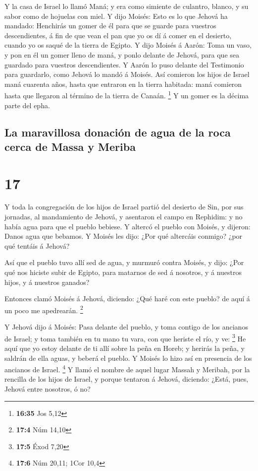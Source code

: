 Y la casa de Israel lo llamó Maná; y era como simiente
de culantro, blanco, y su sabor como de hojuelas con miel.
 Y dijo Moisés: Esto es lo que Jehová ha mandado:
Henchirás un gomer de él para que se guarde para vuestros descendientes,
á fin de que vean el pan que yo os dí á comer en el desierto, cuando yo
os saqué de la tierra de Egipto.  Y dijo Moisés á Aarón:
Toma un vaso, y pon en él un gomer lleno de maná, y ponlo delante de
Jehová, para que sea guardado para vuestros descendientes.
 Y Aarón lo puso delante del Testimonio para guardarlo,
como Jehová lo mandó á Moisés.  Así comieron los hijos de
Israel maná cuarenta años, hasta que entraron en la tierra habitada:
maná comieron hasta que llegaron al término de la tierra de Canaán.
\footnote{\textbf{16:35} Jos 5,12}  Y un gomer es la
décima parte del epha.

\hypertarget{la-maravillosa-donaciuxf3n-de-agua-de-la-roca-cerca-de-massa-y-meriba}{%
\subsection{La maravillosa donación de agua de la roca cerca de Massa y
Meriba}\label{la-maravillosa-donaciuxf3n-de-agua-de-la-roca-cerca-de-massa-y-meriba}}

\hypertarget{section-16}{%
\section{17}\label{section-16}}

 Y toda la congregación de los hijos de Israel partió del
desierto de Sin, por sus jornadas, al mandamiento de Jehová, y asentaron
el campo en Rephidim: y no había agua para que el pueblo bebiese.
 Y altercó el pueblo con Moisés, y dijeron: Danos agua que
bebamos. Y Moisés les dijo: ¿Por qué altercáis conmigo? ¿por qué tentáis
á Jehová?

 Así que el pueblo tuvo allí sed de agua, y murmuró contra
Moisés, y dijo: ¿Por qué nos hiciste subir de Egipto, para matarnos de
sed á nosotros, y á nuestros hijos, y á nuestros ganados?

 Entonces clamó Moisés á Jehová, diciendo: ¿Qué haré con
este pueblo? de aquí á un poco me apedrearán. \footnote{\textbf{17:4}
  Núm 14,10}

 Y Jehová dijo á Moisés: Pasa delante del pueblo, y toma
contigo de los ancianos de Israel; y toma también en tu mano tu vara,
con que heriste el río, y ve: \footnote{\textbf{17:5} Éxod 7,20}
 He aquí que yo estoy delante de ti allí sobre la peña en
Horeb; y herirás la peña, y saldrán de ella aguas, y beberá el pueblo. Y
Moisés lo hizo así en presencia de los ancianos de Israel. \footnote{\textbf{17:6}
  Núm 20,11; 1Cor 10,4}  Y llamó el nombre de aquel lugar
Massah y Meribah, por la rencilla de los hijos de Israel, y porque
tentaron á Jehová, diciendo: ¿Está, pues, Jehová entre nosotros, ó no?

